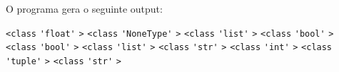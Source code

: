 \documentclass[12pt,varwidth=16cm,border=1pt]{standalone}
\begin{document}
O programa gera o seguinte output:

\verb+<class+ \verb+'float'+ \verb+>+ \newline
\verb+<class+ \verb+'NoneType'+ \verb+>+ \newline
\verb+<class+ \verb+'list'+ \verb+>+ \newline
\verb+<class+ \verb+'bool'+ \verb+>+ \newline
\verb+<class+ \verb+'bool'+ \verb+>+ \newline
\verb+<class+ \verb+'list'+ \verb+>+ \newline
\verb+<class+ \verb+'str'+ \verb+>+ \newline
\verb+<class+ \verb+'int'+ \verb+>+ \newline
\verb+<class+ \verb+'tuple'+ \verb+>+ \newline
\verb+<class+ \verb+'str'+ \verb+>+
\end{document}
